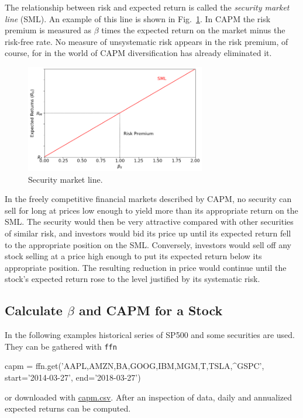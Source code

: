 The relationship between risk and expected return is called the \emph{security market line} (SML). An example of this line is shown in Fig.~\ref{fig:sml}. %
In CAPM the risk premium is measured as $\beta$ times the expected return on the market minus the risk-free rate. No measure of unsystematic risk appears in the risk premium, of course, for in the world of CAPM diversification has already eliminated it.

\begin{figure}[htb]
	\centering
	\includegraphics[width=0.7\textwidth]{figures/sml}
	\caption{Security market line.}
	\label{fig:sml}
\end{figure}

In the freely competitive financial markets described by CAPM, no security can sell for long at prices low enough to yield more than its appropriate return on the SML. The security would then be very attractive compared with other securities of similar risk, and investors would bid its price up until its expected return fell to the appropriate position on the SML. Conversely, investors would sell off any stock selling at a price high enough to put its expected return below its appropriate position. The resulting reduction in price would continue until the stock’s expected return rose to the level justified by its systematic risk.

\subsection{Calculate $\beta$ and CAPM for a Stock}

In the following examples historical series of SP500 and some securities are used. They can be gathered with \texttt{ffn}

\begin{ipython}
capm = ffn.get('AAPL,AMZN,BA,GOOG,IBM,MGM,T,TSLA,^GSPC',
               start='2014-03-27', end='2018-03-27')
\end{ipython}
\noindent
or downloaded with \href{https://raw.githubusercontent.com/matteosan1/finance_course/develop/libro/input_files/capm.csv}{capm.csv}.
After an inspection of data, daily and annualized expected returns can be computed.

